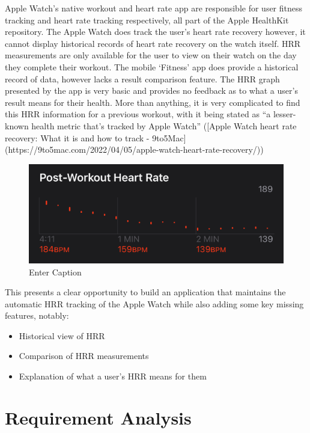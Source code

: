 \documentclass{l4proj}
\begin{document}
Apple Watch’s native workout and heart rate app are responsible for user fitness tracking and heart rate tracking respectively, all part of the Apple HealthKit repository. The Apple Watch does track the user’s heart rate recovery however, it cannot display historical records of heart rate recovery on the watch itself. HRR measurements are only available for the user to view on their watch on the day they complete their workout. The mobile ‘Fitness’ app does provide a historical record of data, however lacks a result comparison feature. The HRR graph presented by the app is very basic and provides no feedback as to what a user’s result means for their health. More than anything, it is very complicated to find this HRR information for a previous workout, with it being stated as “a lesser-known health metric that’s tracked by Apple Watch” ([Apple Watch heart rate recovery: What it is and how to track - 9to5Mac](https://9to5mac.com/2022/04/05/apple-watch-heart-rate-recovery/))

\begin{figure}[h!]
    \centering
    \includegraphics[width=0.5\linewidth]{dissertation//dissImages/AppleWatchHRR.png}
    \caption{Enter Caption}
    \label{fig:enter-label}
\end{figure}

This presents a clear opportunity to build an application that maintains the automatic HRR tracking of the Apple Watch while also adding some key missing features, notably:

\begin{itemize}
    \item Historical view of HRR
    \item Comparison of HRR measurements
    \item Explanation of what a user’s HRR means for them
\end{itemize}

\chapter{Requirement Analysis}
\end{document}
